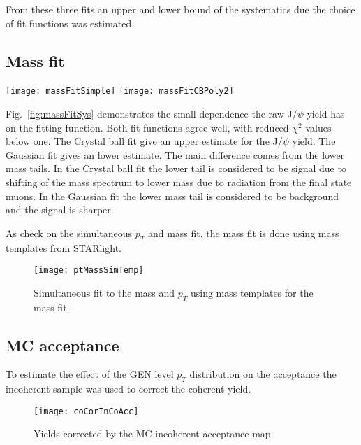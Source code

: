      From these three fits an upper and lower bound of the systematics due
        the choice of fit functions was estimated. 

    \subsection{Mass fit}
      \begin{figure*}[!Hhtb]
        \centering
        \texttt{[image: massFitSimple]}
        \texttt{[image: massFitCBPoly2]}
        \caption{Mass fit to J/$\psi$ using Gaussian (Left) and Crystal Ball (Right) for the 
          signal and a polynomial for the background}
        \label{fig:massFitSys}
      \end{figure*}
      Fig.~\ref{fig:massFitSys} demonstrates the small dependence the raw J/$\psi$ 
        yield has on the fitting function. 
      Both fit functions agree well, with reduced $\chi^{2}$ values below one.
      The Crystal ball fit give an upper estimate for the J/$\psi$ yield.
      The Gaussian fit gives an lower estimate. 
      The main difference comes from the lower mass tails.
      In the Crystal ball fit the lower tail is considered to be signal due to 
        shifting of the mass spectrum to lower mass due to radiation from the 
        final state muons. 
      In the Gaussian fit the lower mass tail is considered to be background and 
        the signal is sharper.

      As check on the simultaneous $p_{T}$ and mass fit, the mass fit is done
        using mass templates from STARlight.
      \begin{figure}[!Hhbt]
        \centering
        \texttt{[image: ptMassSimTemp]}
        \caption{Simultaneous fit to the mass and $p_{T}$ using mass templates
          for the mass fit. }
        \label{fig:simFitTemp}
      \end{figure}

    \subsection{MC acceptance}
      To estimate the effect of the GEN level $p_{T}$ distribution on the 
        acceptance the incoherent sample was used to correct the coherent 
        yield.
      \begin{figure}[!Hhbt]
        \centering
        \texttt{[image: coCorInCoAcc]}
        \caption{Yields corrected by the MC incoherent acceptance map.}
        \label{fig:coYieldInCoCor}
      \end{figure}

